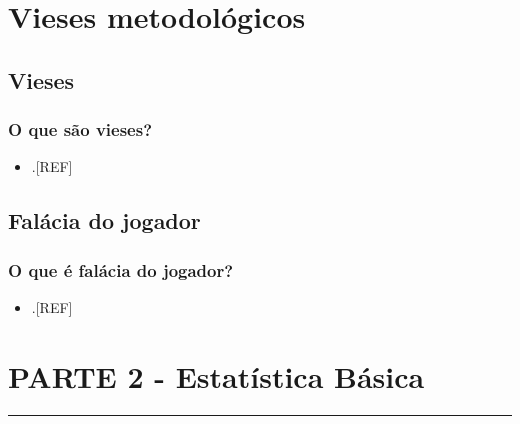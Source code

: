 \documentclass[
  a4paper,
]{book}
\providecommand{\tightlist}{%
  \setlength{\itemsep}{0pt}\setlength{\parskip}{0pt}}
\begin{document}
\hypertarget{vieses-metodologicos}{%
\chapter{\texorpdfstring{\textbf{Vieses metodológicos}}{Vieses metodológicos}}\label{vieses-metodologicos}}

\hypertarget{vieses}{%
\section{Vieses}\label{vieses}}

\hypertarget{o-que-suxe3o-vieses}{%
\subsection{O que são vieses?}\label{o-que-suxe3o-vieses}}

\begin{itemize}
\tightlist
\item
  .{[}REF{]}
\end{itemize}

\hypertarget{jogador}{%
\section{Falácia do jogador}\label{jogador}}

\hypertarget{o-que-uxe9-faluxe1cia-do-jogador}{%
\subsection{O que é falácia do jogador?}\label{o-que-uxe9-faluxe1cia-do-jogador}}

\begin{itemize}
\tightlist
\item
  .{[}REF{]}
\end{itemize}


\hypertarget{parte-2---estatuxedstica-buxe1sica}{%
\chapter*{\texorpdfstring{\textbf{PARTE 2 - Estatística Básica}}{PARTE 2 - Estatística Básica}}\label{parte-2---estatuxedstica-buxe1sica}}

\markboth{}{}
\par\noindent\rule{\textwidth}{0.05in}
\end{document}

